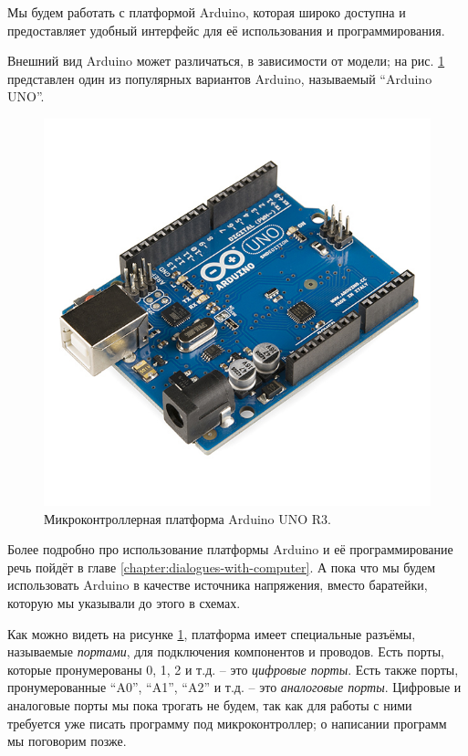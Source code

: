 \documentclass[a4paper,twoside]{book}
\begin{document}
Мы будем работать с платформой Arduino, которая широко доступна и предоставляет
удобный интерфейс для её использования и программирования.

Внешний вид Arduino может различаться, в зависимости от модели; на
рис. \ref{fig:arduino-uno-r3} представлен один из популярных вариантов Arduino,
называемый ``Arduino UNO''.

\begin{figure}[ht]
  \centering
  \includegraphics[width=12cm]{Arduino_Uno_-_R3}
  \caption{Микроконтроллерная платформа Arduino UNO R3.}
  \label{fig:arduino-uno-r3}
\end{figure}

Более подробно про использование платформы Arduino и её программирование речь
пойдёт в главе \ref{chapter:dialogues-with-computer}.  А пока что мы будем
использовать Arduino в качестве источника напряжения, вместо баратейки, которую
мы указывали до этого в схемах.

Как можно видеть на рисунке \ref{fig:arduino-uno-r3}, платформа имеет
специальные разъёмы, называемые \emph{портами}, для подключения компонентов и
проводов.  Есть порты, которые пронумерованы 0, 1, 2 и т.д. -- это
\emph{цифровые порты}.  Есть также порты, пронумерованные ``A0'', ``A1'', ``A2''
и т.д. -- это \emph{аналоговые порты}.  Цифровые и аналоговые порты мы пока
трогать не будем, так как для работы с ними требуется уже писать программу под
микроконтроллер; о написании программ мы поговорим позже.
\end{document}
